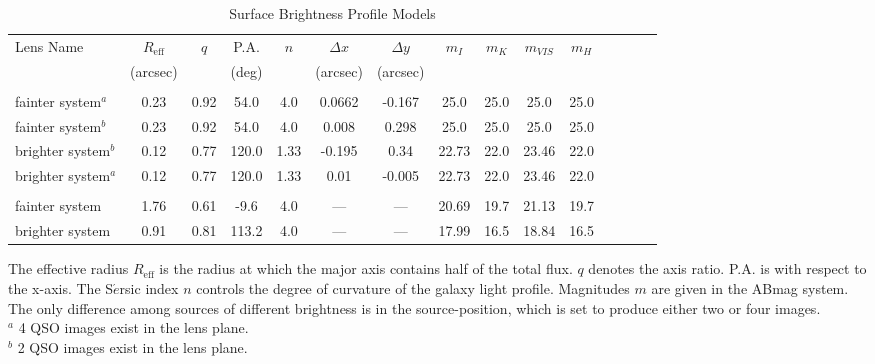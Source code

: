 \documentclass[a4paper,11pt]{article}
\begin{document}
\begin{table}\footnotesize
\begin{center}
\caption{Surface Brightness Profile Models}
\begin{tabular}{lcccccccccccccc|}
\hline \hline
 Lens Name & $R_\textrm{eff}$ & $q$ & P.A. & $n$ & $\Delta x$ & $\Delta y$ & $m_{I}$ & $m_{K}$ & $m_{VIS}$ & $m_{H}$ \\
& (arcsec) & & (deg) & & (arcsec) & (arcsec) & & & & \\
\hline\noalign{\smallskip}
\multicolumn{11}{c}{Parameters for the Source}
\tabularnewline \hline \noalign{\smallskip}
fainter system$^a$  & 0.23 & 0.92 & 54.0 & 4.0 & 0.0662 & -0.167 & 25.0 & 25.0 & 25.0 &25.0 \\
fainter system$^b$ & 0.23 & 0.92 & 54.0 & 4.0 & 0.008 & 0.298 & 25.0 & 25.0 & 25.0 & 25.0 \\
brighter system$^b$ & 0.12 & 0.77 & 120.0 & 1.33 & -0.195 &  0.34 & 22.73 & 22.0 & 23.46 & 22.0 \\
brighter system$^a$ & 0.12 & 0.77 & 120.0 & 1.33 & 0.01 & -0.005 & 22.73 & 22.0 & 23.46 & 22.0 \\

\hline\noalign{\smallskip}
\multicolumn{11}{c}{Parameters for the lens}
\tabularnewline \hline \noalign{\smallskip}
fainter system & 1.76 & 0.61 & -9.6 & 4.0 & --- & --- & 20.69 & 19.7 & 21.13 & 19.7 \\
brighter system & 0.91 & 0.81 & 113.2 & 4.0 & --- & --- & 17.99 & 16.5 & 18.84 & 16.5 \\
\hline
\hline
\end{tabular}
\begin{tablenotes}
\item 
The effective radius $R_\textrm{eff}$ is the radius at which the major axis contains half of the total flux. $q$ denotes the axis ratio. P.A. is with respect to the x-axis. The S$\acute{e}$rsic index $n$ controls the degree of curvature of the galaxy light profile. Magnitudes $m$ are given in the ABmag system. The only difference among sources of different brightness is in the source-position, which is set to produce either two or four images.\\
$^a$ 4 QSO images exist in the lens plane. \\
$^b$ 2 QSO images exist in the lens plane. \\
\end{tablenotes}
\label{tab:SBProfile}
\end{center}
\end{table}
\end{document}
